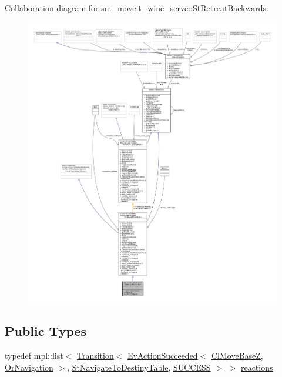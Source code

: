Collaboration diagram for sm\+\_\+moveit\+\_\+wine\+\_\+serve\+:\+:St\+Retreat\+Backwards\+:
\nopagebreak
\begin{figure}[H]
\begin{center}
\leavevmode
\includegraphics[width=350pt]{structsm__moveit__wine__serve_1_1StRetreatBackwards__coll__graph}
\end{center}
\end{figure}
\subsection*{Public Types}
\begin{DoxyCompactItemize}
\item 
typedef mpl\+::list$<$ \hyperlink{classsmacc_1_1Transition}{Transition}$<$ \hyperlink{structsmacc_1_1default__events_1_1EvActionSucceeded}{Ev\+Action\+Succeeded}$<$ \hyperlink{classcl__move__base__z_1_1ClMoveBaseZ}{Cl\+Move\+BaseZ}, \hyperlink{classsm__moveit__wine__serve_1_1OrNavigation}{Or\+Navigation} $>$, \hyperlink{structsm__moveit__wine__serve_1_1StNavigateToDestinyTable}{St\+Navigate\+To\+Destiny\+Table}, \hyperlink{structsmacc_1_1default__transition__tags_1_1SUCCESS}{S\+U\+C\+C\+E\+SS} $>$ $>$ \hyperlink{structsm__moveit__wine__serve_1_1StRetreatBackwards_a052e88b7875186070d76603bd1051aa9}{reactions}
\end{DoxyCompactItemize}
